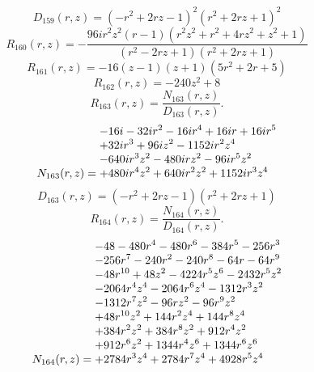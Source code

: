 \documentclass[11pt,a4paper]{article}
\begin{document}
\begin{equation}
D_{159}(r,z)=\left(- r^{2} + 2 r z - 1\right)^{2} \left(r^{2} + 2 r z + 1\right)^{2}
\label{eq:cat-denominator-159}
\end{equation}
\begin{equation}
R_{160}(r,z)=- \frac{96 i r^{2} z^{2} \left(r - 1\right) \left(r^{2} z^{2} + r^{2} + 4 r z^{2} + z^{2} + 1\right)}{\left(r^{2} - 2 r z + 1\right) \left(r^{2} + 2 r z + 1\right)}
\label{eq:cat-rational-160}
\end{equation}
\begin{equation}
R_{161}(r,z)=- 16 \left(z - 1\right) \left(z + 1\right) \left(5 r^{2} + 2 r + 5\right)
\label{eq:cat-rational-161}
\end{equation}
\begin{equation}
R_{162}(r,z)=- 240 z^{2} + 8
\label{eq:cat-rational-162}
\end{equation}
\begin{equation}
R_{163}(r,z)=\frac{N_{163}(r,z)}{D_{163}(r,z)}.
\label{eq:cat-rational-163}
\end{equation}
\begin{equation}
N_{163}(r,z)=\shortstack[l]{$\displaystyle  - 16 i - 32 i r^{2} - 16 i r^{4} + 16 i r + 16 i r^{5}$\\
$\displaystyle  + 32 i r^{3} + 96 i z^{2} - 1152 i r^{2} z^{4}$\\
$\displaystyle  - 640 i r^{3} z^{2} - 480 i r z^{2} - 96 i r^{5} z^{2}$\\
$\displaystyle  + 480 i r^{4} z^{2} + 640 i r^{2} z^{2} + 1152 i r^{3} z^{4}$}
\label{eq:cat-numerator-163}
\end{equation}
\begin{equation}
D_{163}(r,z)=\left(- r^{2} + 2 r z - 1\right) \left(r^{2} + 2 r z + 1\right)
\label{eq:cat-denominator-163}
\end{equation}
\begin{equation}
R_{164}(r,z)=\frac{N_{164}(r,z)}{D_{164}(r,z)}.
\label{eq:cat-rational-164}
\end{equation}
\begin{equation}
N_{164}(r,z)=\shortstack[l]{$\displaystyle  - 48 - 480 r^{4} - 480 r^{6} - 384 r^{5} - 256 r^{3}$\\
$\displaystyle  - 256 r^{7} - 240 r^{2} - 240 r^{8} - 64 r - 64 r^{9}$\\
$\displaystyle  - 48 r^{10} + 48 z^{2} - 4224 r^{5} z^{6} - 2432 r^{5} z^{2}$\\
$\displaystyle  - 2064 r^{4} z^{4} - 2064 r^{6} z^{4} - 1312 r^{3} z^{2}$\\
$\displaystyle  - 1312 r^{7} z^{2} - 96 r z^{2} - 96 r^{9} z^{2}$\\
$\displaystyle  + 48 r^{10} z^{2} + 144 r^{2} z^{4} + 144 r^{8} z^{4}$\\
$\displaystyle  + 384 r^{2} z^{2} + 384 r^{8} z^{2} + 912 r^{4} z^{2}$\\
$\displaystyle  + 912 r^{6} z^{2} + 1344 r^{4} z^{6} + 1344 r^{6} z^{6}$\\
$\displaystyle  + 2784 r^{3} z^{4} + 2784 r^{7} z^{4} + 4928 r^{5} z^{4}$}
\label{eq:cat-numerator-164}
\end{equation}
\end{document}
